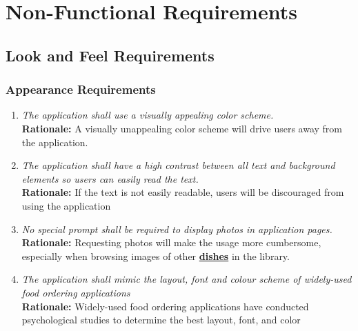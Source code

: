 \documentclass[]{article}
\begin{document}

\section{Non-Functional Requirements}
\label{sec:non-functional_requirements}

\subsection{Look and Feel Requirements}
\label{sub:look_and_feel_requirements}

\subsubsection{Appearance Requirements}
\label{ssub:appearance_requirements}
\begin{enumerate}[{LF-A}1. ]
    \item \textit{The application shall use a visually appealing color scheme.} \\ \textbf{Rationale:} A visually unappealing color scheme will drive users away from the application.
    \item \textit{The application shall have a high contrast between all text and background elements so users can easily read the text.} \\
    \textbf{Rationale:} If the text is not easily readable, users will be discouraged from using the application
    \item \textit{No special prompt shall be required to display photos in application pages.} \\ \textbf{Rationale:} Requesting photos will make the usage more cumbersome, especially when browsing images of other \hyperref[Dish]{\textbf{dishes}} in the library.
	\item \textit{The application shall mimic the layout, font and colour scheme of widely-used food ordering applications} \\ \textbf{Rationale:} Widely-used food ordering applications have conducted psychological studies to determine the best layout, font, and color 
\end{enumerate}
\end{document}
